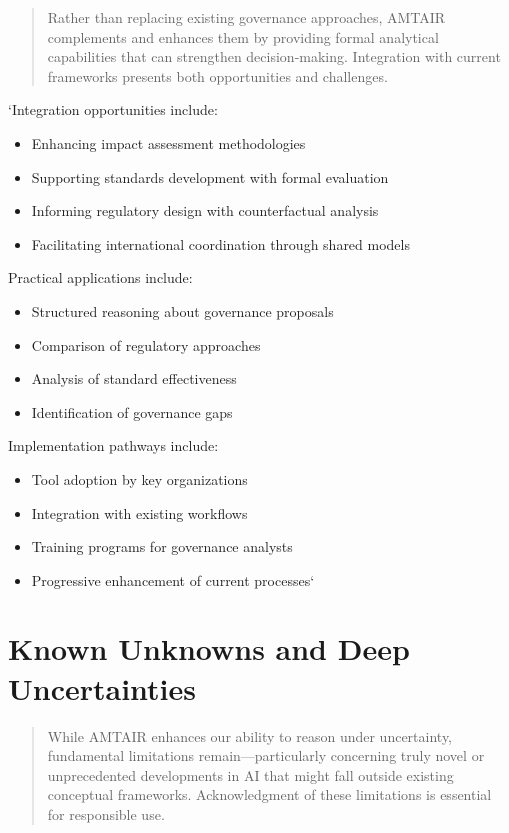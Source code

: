\documentclass[]{book}
\providecommand{\tightlist}{%
  \setlength{\itemsep}{0pt}\setlength{\parskip}{0pt}}
\begin{document}
\begin{quote}
Rather than replacing existing governance approaches, AMTAIR complements
and enhances them by providing formal analytical capabilities that can
strengthen decision-making. Integration with current frameworks presents
both opportunities and challenges.
\end{quote}

`Integration opportunities include:

\begin{itemize}
\tightlist
\item
  Enhancing impact assessment methodologies
\item
  Supporting standards development with formal evaluation
\item
  Informing regulatory design with counterfactual analysis
\item
  Facilitating international coordination through shared models
\end{itemize}

Practical applications include:

\begin{itemize}
\tightlist
\item
  Structured reasoning about governance proposals
\item
  Comparison of regulatory approaches
\item
  Analysis of standard effectiveness
\item
  Identification of governance gaps
\end{itemize}

Implementation pathways include:

\begin{itemize}
\tightlist
\item
  Tool adoption by key organizations
\item
  Integration with existing workflows
\item
  Training programs for governance analysts
\item
  Progressive enhancement of current processes`
\end{itemize}

\section{Known Unknowns and Deep
Uncertainties}\label{sec-deep-uncertainties}

\begin{quote}
While AMTAIR enhances our ability to reason under uncertainty,
fundamental limitations remain---particularly concerning truly novel or
unprecedented developments in AI that might fall outside existing
conceptual frameworks. Acknowledgment of these limitations is essential
for responsible use.
\end{quote}
\end{document}
